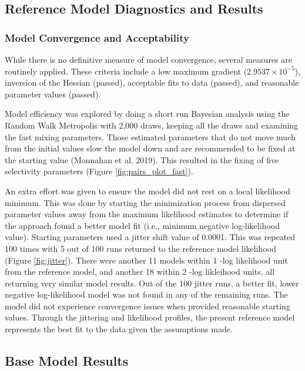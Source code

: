 \documentclass[11pt,
  english,
  letterpaper,
]{article}
\begin{document}
\hypertarget{reference-model-diagnostics-and-results}{%
\subsection{Reference Model Diagnostics and Results}\label{reference-model-diagnostics-and-results}}

\hypertarget{model-convergence}{%
\subsubsection{Model Convergence and Acceptability}\label{model-convergence}}

While there is no definitive measure of model convergence, several measures are routinely applied. These criteria include a low maximum gradient (\ensuremath{2.9537\times 10^{-5}}), inversion of the Hessian (passed), acceptable fits to data (passed), and reasonable parameter values (passed).

Model efficiency was explored by doing a short run Bayesian analysis using the Random Walk Metropolis with 2,000 draws, keeping all the draws and examining the fast mixing parameters. Those estimated parameters that do not move much from the initial values slow the model down and are recommended to be fixed at the starting value (Monnahan et al. 2019). This resulted in the fixing of five selectivity parameters (Figure \ref{fig:pairs_plot_fast}).

An extra effort was given to ensure the model did not rest on a local likelihood minimum. This was done by starting the minimization process from dispersed parameter values away from the maximum likelihood estimates to determine if the approach found a better model fit (i.e., minimum negative log-likelihood value). Starting parameters used a jitter shift value of 0.0001. This was repeated 100 times with 5 out of 100 runs returned to the reference model likelihood (Figure \ref{fig:jitter}). There were another 11 models within 1 -log likelihood unit from the reference model, and another 18 within 2 -log likleihood units, all returning very similar model results. Out of the 100 jitter runs, a better fit, lower negative log-likelihood model was not found in any of the remaining runs. The model did not experience convergence issues when provided reasonable starting values. Through the jittering and likelihood profiles, the present reference model represents the best fit to the data given the assumptions made.

\hypertarget{base-model-results}{%
\subsection{Base Model Results}\label{base-model-results}}
\end{document}
